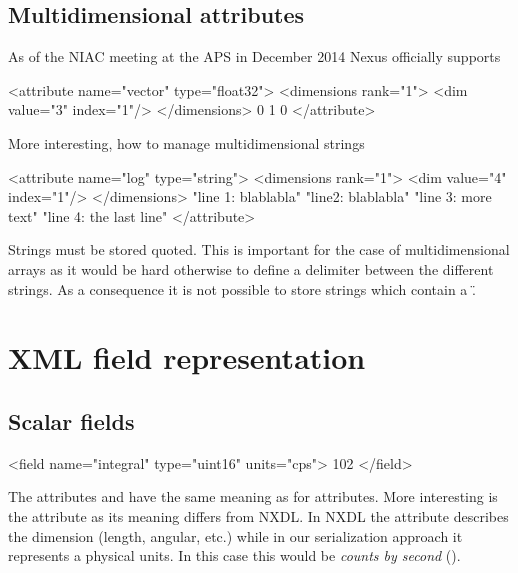 \subsection{Multidimensional attributes}

As of the NIAC meeting at the APS in December 2014 Nexus officially supports

\begin{xmlcode}
<attribute name="vector" type="float32">
    <dimensions rank="1">
        <dim value="3" index="1"/>
    </dimensions>
    0 1 0 
</attribute>
\end{xmlcode}

More interesting, how to manage multidimensional strings 
\begin{xmlcode}
<attribute name="log" type="string">
    <dimensions rank="1">
        <dim value="4" index="1"/>
    </dimensions>
    "line 1: blablabla" "line2: blablabla" 
    "line 3: more text" "line 4: the last line"
</attribute>
\end{xmlcode}
Strings must be stored quoted. This is important for the case of
multidimensional arrays as it would be hard otherwise to define a delimiter 
between the different strings. As a consequence it is not possible to store 
strings which contain a \".

\section{XML field representation}

\subsection{Scalar fields}

\begin{xmlcode}
<field name="integral" type="uint16" units="cps"> 102 </field>
\end{xmlcode}
The attributes  and  have the same meaning as for 
attributes. More interesting is the  attribute as its meaning 
differs from NXDL. In NXDL the  attribute describes the 
dimension (length, angular, etc.) while in our serialization approach 
it represents a physical units. In this case this would be \emph{counts by 
second} ().

